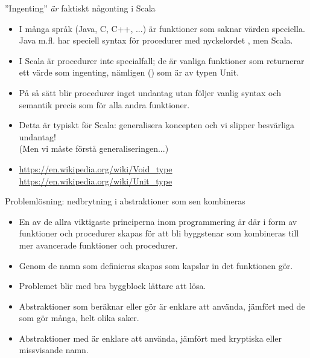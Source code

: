 \begin{Slide}{''Ingenting'' \emph{är} faktiskt någonting i Scala}
\begin{itemize}
\item I många språk (Java, C, C++, ...) är funktioner som saknar värden speciella.
 Java m.fl. har speciell syntax för procedurer med nyckelordet , men  Scala.

\item I Scala är procedurer inte specialfall; de är vanliga funktioner som returnerar ett värde som  ingenting, nämligen () som är av typen Unit.

\item På så sätt blir procedurer inget undantag utan följer vanlig syntax och semantik precis som för alla andra funktioner.

\item Detta är typiskt för Scala: generalisera koncepten och vi slipper besvärliga undantag! \\(Men vi måste förstå generaliseringen...)


\item [] {\SlideFontSmall
\url{https://en.wikipedia.org/wiki/Void_type}
\url{https://en.wikipedia.org/wiki/Unit_type}
}

\end{itemize}

\end{Slide}

\begin{Slide}{Problemlösning: nedbrytning i abstraktioner som sen kombineras}\SlideFontSmall
\begin{itemize}
\item En av de allra viktigaste principerna inom programmering är  där   i form av funktioner och procedurer skapas för att bli byggstenar som kombineras till mer avancerade funktioner och procedurer.

\item Genom de namn som definieras skapas  som kapslar in det funktionen gör.

\item Problemet blir med bra byggblock lättare att lösa.

\item Abstraktioner som beräknar eller gör  är enklare att använda, jämfört med de som gör många, helt olika saker.

\item Abstraktioner med  är enklare att använda, jämfört med kryptiska eller missvisande namn.
\end{itemize}

\end{Slide}



